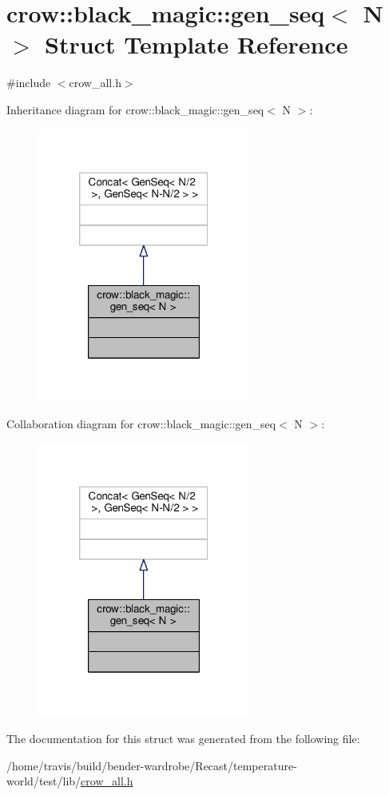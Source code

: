 \hypertarget{structcrow_1_1black__magic_1_1gen__seq}{\section{crow\-:\-:black\-\_\-magic\-:\-:gen\-\_\-seq$<$ N $>$ Struct Template Reference}
\label{structcrow_1_1black__magic_1_1gen__seq}
}


{\ttfamily \#include $<$crow\-\_\-all.\-h$>$}



Inheritance diagram for crow\-:\-:black\-\_\-magic\-:\-:gen\-\_\-seq$<$ N $>$\-:
\nopagebreak
\begin{figure}[H]
\begin{center}
\leavevmode
\includegraphics[width=198pt]{structcrow_1_1black__magic_1_1gen__seq__inherit__graph}
\end{center}
\end{figure}


Collaboration diagram for crow\-:\-:black\-\_\-magic\-:\-:gen\-\_\-seq$<$ N $>$\-:
\nopagebreak
\begin{figure}[H]
\begin{center}
\leavevmode
\includegraphics[width=198pt]{structcrow_1_1black__magic_1_1gen__seq__coll__graph}
\end{center}
\end{figure}


The documentation for this struct was generated from the following file\-:\begin{DoxyCompactItemize}
\item 
/home/travis/build/bender-\/wardrobe/\-Recast/temperature-\/world/test/lib/\hyperlink{crow__all_8h}{crow\-\_\-all.\-h}\end{DoxyCompactItemize}
